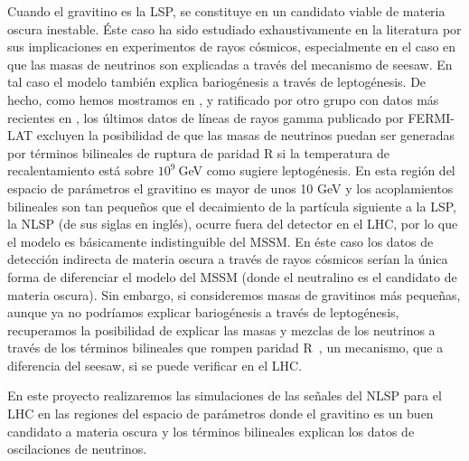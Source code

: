 Cuando el gravitino es la LSP, se constituye en un candidato viable de
materia oscura inestable. Éste caso ha sido estudiado exhaustivamente
en la literatura por sus implicaciones en experimentos de rayos
cósmicos, especialmente en el caso en que las masas de neutrinos son
explicadas a través del mecanismo de seesaw. En tal caso el modelo
también explica bariogénesis a través de leptogénesis. De hecho, como
hemos mostramos en \cite{Choi:2010jt}, y ratificado por otro grupo con
datos más recientes en \cite{Garny:2010eg}, los últimos datos de
líneas de rayos gamma publicado por FERMI-LAT excluyen la posibilidad
de que las masas de neutrinos puedan ser generadas por términos
bilineales de ruptura de paridad R si la temperatura de
recalentamiento está sobre $10^9\ $GeV como sugiere leptogénesis. En
esta región del espacio de parámetros el gravitino es mayor de unos 10
GeV y los acoplamientos bilineales son tan pequeños que el decaimiento
de la partícula siguiente a la LSP, la NLSP (de sus siglas en inglés),
ocurre fuera del detector en el LHC, por lo que el modelo es
básicamente indistinguible del MSSM. En éste caso los datos de
detección indirecta de materia oscura a través de rayos cósmicos
serían la única forma de diferenciar el modelo del MSSM (donde el
neutralino es el candidato de materia oscura). Sin embargo, si
consideremos masas de gravitinos más pequeñas, aunque ya no podríamos
explicar bariogénesis a través de leptogénesis, recuperamos la
posibilidad de explicar las masas y mezclas de los neutrinos a través de
los términos bilineales que rompen paridad R~\cite{Hirsch:2005ag}, un
mecanismo, que a diferencia del seesaw, si se puede verificar en el
LHC.

\begin{proyecto}
  En este proyecto realizaremos las simulaciones de las señales del
  NLSP para el LHC  en las regiones del
  espacio de parámetros donde el gravitino es un buen candidato a
  materia oscura y los términos bilineales explican los datos de
  oscilaciones de neutrinos. 
\end{proyecto}


